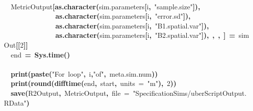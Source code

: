 \documentclass{article}
\makeatletter
\newcommand{\hlnumber}[1]{\textcolor[rgb]{0,0,0}{#1}}%
\newcommand{\hlfunctioncall}[1]{\textcolor[rgb]{0.501960784313725,0,0.329411764705882}{\textbf{#1}}}%
\newcommand{\hlstring}[1]{\textcolor[rgb]{0.6,0.6,1}{#1}}%
\newcommand{\hlkeyword}[1]{\textcolor[rgb]{0,0,0}{\textbf{#1}}}%
\newcommand{\hlargument}[1]{\textcolor[rgb]{0.690196078431373,0.250980392156863,0.0196078431372549}{#1}}%
\newcommand{\hlassignement}[1]{\textcolor[rgb]{0,0,0}{\textbf{#1}}}%
\newcommand{\hlsymbol}[1]{\textcolor[rgb]{0,0,0}{#1}}%
\newcommand{\hlstd}[1]{\textcolor[rgb]{0,0,0}{#1}}%
\newenvironment{kframe}{%
 \def\FrameCommand##1{\hskip\@totalleftmargin \hskip-\fboxsep
 \colorbox{shadecolor}{##1}\hskip-\fboxsep
     \hskip-\linewidth \hskip-\@totalleftmargin \hskip\columnwidth}%
 \MakeFramed {\advance\hsize-\width
   \@totalleftmargin\z@ \linewidth\hsize
   \@setminipage}}%
 {\par\unskip\endMakeFramed}
\newenvironment{knitrout}{}{} %
\makeatother
\begin{document}
\begin{knitrout}
\begin{kframe}
\begin{flushleft}
\hlstd{}\hspace*{\fill}\\
\hlstd{}{\ }{\ }\hlsymbol{MetricOutput}\hlkeyword{[}\hlfunctioncall{as.character}\hlkeyword{(}\hlsymbol{sim.parameters}\hlkeyword{[}\hlsymbol{i}\hlkeyword{,}{\ }\hlstring{"{}sample.size"{}}\hlkeyword{]}\hlkeyword{)}\hlkeyword{,}\hspace*{\fill}\\
\hlstd{}{\ }{\ }{\ }{\ }{\ }{\ }{\ }{\ }{\ }{\ }{\ }{\ }{\ }{\ }{\ }\hlfunctioncall{as.character}\hlkeyword{(}\hlsymbol{sim.parameters}\hlkeyword{[}\hlsymbol{i}\hlkeyword{,}{\ }\hlstring{"{}error.sd"{}}\hlkeyword{]}\hlkeyword{)}\hlkeyword{,}\hspace*{\fill}\\
\hlstd{}{\ }{\ }{\ }{\ }{\ }{\ }{\ }{\ }{\ }{\ }{\ }{\ }{\ }{\ }{\ }\hlfunctioncall{as.character}\hlkeyword{(}\hlsymbol{sim.parameters}\hlkeyword{[}\hlsymbol{i}\hlkeyword{,}{\ }\hlstring{"{}B1.spatial.var"{}}\hlkeyword{]}\hlkeyword{)}\hlkeyword{,}\hspace*{\fill}\\
\hlstd{}{\ }{\ }{\ }{\ }{\ }{\ }{\ }{\ }{\ }{\ }{\ }{\ }{\ }{\ }{\ }\hlfunctioncall{as.character}\hlkeyword{(}\hlsymbol{sim.parameters}\hlkeyword{[}\hlsymbol{i}\hlkeyword{,}{\ }\hlstring{"{}B2.spatial.var"{}}\hlkeyword{]}\hlkeyword{)}\hlkeyword{,}{\ }\hlkeyword{,}{\ }\hlkeyword{,}{\ }\hlkeyword{]}{\ }\hlassignement{=}{\ }\hlsymbol{simOut}\hlkeyword{[[}\hlnumber{2}\hlkeyword{]}\hlkeyword{]}\hspace*{\fill}\\
\hlstd{}{\ }{\ }\hlsymbol{end}{\ }\hlassignement{=}{\ }\hlfunctioncall{Sys.time}\hlkeyword{(}\hlkeyword{)}\hspace*{\fill}\\
\hlstd{}\hspace*{\fill}\\
\hlstd{}{\ }{\ }\hlfunctioncall{print}\hlkeyword{(}\hlfunctioncall{paste}\hlkeyword{(}\hlstring{"{}For{\ }loop"{}}\hlkeyword{,}{\ }\hlsymbol{i}\hlkeyword{,}\hlstring{"{}of"{}}\hlkeyword{,}{\ }\hlsymbol{meta.sim.num}\hlkeyword{)}\hlkeyword{)}\hspace*{\fill}\\
\hlstd{}{\ }{\ }\hlfunctioncall{print}\hlkeyword{(}\hlfunctioncall{round}\hlkeyword{(}\hlfunctioncall{difftime}\hlkeyword{(}\hlsymbol{end}\hlkeyword{,}{\ }\hlsymbol{start}\hlkeyword{,}{\ }\hlargument{units}{\ }\hlargument{=}{\ }\hlstring{"{}m"{}}\hlkeyword{)}\hlkeyword{,}{\ }\hlnumber{2}\hlkeyword{)}\hlkeyword{)}\hspace*{\fill}\\
\hlstd{}{\ }{\ }\hlfunctioncall{save}\hlkeyword{(}\hlsymbol{R2Output}\hlkeyword{,}{\ }\hlsymbol{MetricOutput}\hlkeyword{,}{\ }\hlargument{file}{\ }\hlargument{=}{\ }\hlstring{"{}SpecificationSims/uberScriptOutput.RData"{}}\hlkeyword{)}\hspace*{\fill}\\
\hlstd{}\hlkeyword{\usebox{\hlnormalsizeboxclosebrace}}\mbox{}
\normalfont
\end{flushleft}
\end{kframe}
\end{knitrout}
\end{document}
